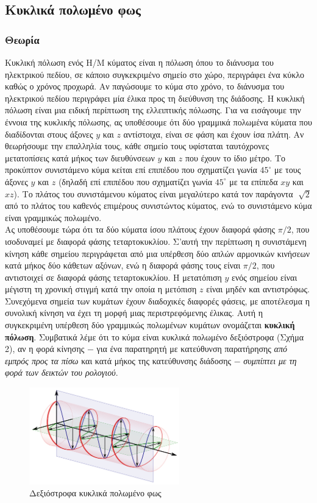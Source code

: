 \documentclass[a4paper,11pt,titlepage]{article}
\newcommand{\degrees}{^{\circ}}
\begin{document}
\newpage
\subsection{Κυκλικά πολωμένο φως}
\subsubsection{Θεωρία}
Κυκλική πόλωση ενός Η/Μ κύματος είναι η πόλωση όπου το διάνυσμα του ηλεκτρικού πεδίου, σε κάποιο συγκεκριμένο σημείο στο χώρο, περιγράφει ένα κύκλο καθώς ο χρόνος προχωρά. Αν παγώσουμε το κύμα στο χρόνο, το διάνυσμα του ηλεκτρικού πεδίου περιγράφει μία έλικα προς τη διεύθυνση της διάδοσης. Η κυκλική πόλωση είναι μια ειδική περίπτωση της ελλειπτικής πόλωσης. Για να εισάγουμε την έννοια της κυκλικής πόλωσης, ας υποθέσουμε ότι δύο γραμμικά πολωμένα κύματα που διαδίδονται στους άξονες $y$ και $z$ αντίστοιχα, είναι σε φάση και έχουν ίσα πλάτη. Αν θεωρήσουμε την επαλληλία τους, κάθε σημείο τους υφίσταται ταυτόχρονες μετατοπίσεις κατά μήκος των διευθύνσεων $y$ και $z$ που έχουν το ίδιο μέτρο. Το προκύπτον συνιστάμενο κύμα κείται επί επιπέδου που σχηματίζει γωνία $45\degrees$ με τους άξονες $y$ και $z$ (δηλαδή επί επιπέδου που σχηματίζει γωνία $45\degrees$ με τα επίπεδα $xy$ και $xz$). Το πλάτος του συνιστάμενου κύματος είναι μεγαλύτερο κατά τον παράγοντα $\sqrt[]{2}$ από το πλάτος του καθενός επιμέρους συνιστώντος κύματος, ενώ το συνιστάμενο κύμα είναι γραμμικώς πολωμένο. \\ 
Ας υποθέσουμε τώρα ότι τα δύο κύματα ίσου πλάτους έχουν διαφορά φάσης $\pi/2$, που ισοδυναμεί με διαφορά φάσης τεταρτοκυκλίου. Σ'αυτή την περίπτωση η συνιστάμενη κίνηση κάθε σημείου περιγράφεται από μια υπέρθεση δύο απλών αρμονικών κινήσεων κατά μήκος δύο κάθετων αξόνων, ενώ η διαφορά φάσης τους είναι $\pi/2$, που αντιστοιχεί σε διαφορά φάσης τεταρτοκυκλίου. Η μετατόπιση $y$ ενός σημείου είναι μέγιστη τη χρονική στιγμή κατά την οποία η μετόπιση $z$ είναι μηδέν και αντιστρόφως. Συνεχόμενα σημεία των κυμάτων έχουν διαδοχικές διαφορές φάσεις, με αποτέλεσμα η συνολική κίνηση να έχει τη μορφή μιας περιστρεφόμενης έλικας. Αυτή η συγκεκριμένη υπέρθεση δύο γραμμικώς πολωμένων κυμάτων ονομάζεται {\bf κυκλική πόλωση}. Συμβατικά λέμε ότι το κύμα είναι κυκλικά πολωμένο δεξιόστροφα (Σχήμα 2), αν η φορά κίνησης $-$ για ένα παρατηρητή με κατεύθυνση παρατήρησης \textit{από εμπρός προς τα πίσω} και κατά μήκος της κατεύθυνσης διάδοσης $-$ \textit{συμπίπτει με τη φορά των δεικτών του ρολογιού}.
\begin{figure} [bph!]
\centering
\includegraphics[width=65mm]{Circular.Polarization.png}
\caption{Δεξιόστροφα κυκλικά πολωμένο φως}
\end{figure}
\newpage
\end{document}
